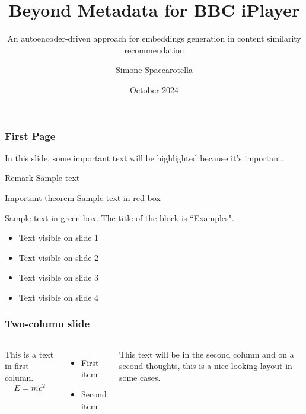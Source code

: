 \documentclass{beamer}
\title{Beyond Metadata for BBC iPlayer}
\subtitle{An autoencoder-driven approach for embeddings generation in content similarity recommendation}
\author{Simone Spaccarotella}
\institute{BBC}
\date{October 2024}
\begin{document}
\frame{\titlepage}

\begin{frame}
  \frametitle{First Page}
  In this slide, some important text will be
  \alert{highlighted} because it's important.

  \begin{block}{Remark}
    Sample text
  \end{block}

  \begin{alertblock}{Important theorem}
    Sample text in red box
  \end{alertblock}

  \begin{examples}
    Sample text in green box. The title of the block is ``Examples".
  \end{examples}

  \begin{itemize}
    \pause
    \item Text visible on slide 1
    \pause
    \item Text visible on slide 2
    \pause
    \item Text visible on slide 3
    \pause
    \item Text visible on slide 4
  \end{itemize}
\end{frame}

\begin{frame}
  \frametitle{Two-column slide}
  \begin{columns}

    This is a text in first column.
    $$E=mc^2$$
    \begin{itemize}
      \item First item
      \item Second item
    \end{itemize}

    This text will be in the second column
    and on a second thoughts, this is a nice looking
    layout in some cases.
  \end{columns}
\end{frame}
\end{document}
